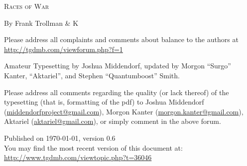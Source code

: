 \pagestyle{plain}

\begin{center} \Huge

\textsc{Races of War}\end{center}



\vspace{2cm}
\begin{center}\large By Frank Trollman \& K\end{center}


\newpage

\vspace*{4in}

\noindent Please address all complaints and comments about balance to the authors at\\
{\color{blue} \href{http://tgdmb.com/viewforum.php?f=1}{http://tgdmb.com/viewforum.php?f=1}}

\vspace{0.2in}



\noindent Amateur Typesetting by Joshua Middendorf, updated by Morgon ``Surgo'' Kanter, ``Aktariel'', and Stephen ``Quantumboost'' Smith.

\vspace{0.15in}

\noindent Please address all comments regarding the quality (or lack thereof) of the typesetting (that is, formatting of the pdf) to Joshua Middendorf (\href{mailto:middendorfproject@gmail.com}{middendorfproject@gmail.com}), Morgon Kanter (\href{mailto:morgon.kanter@gmail.com}{morgon.kanter@gmail.com}), Aktariel (\href{mailto:aktariel@gmail.com}{aktariel@gmail.com}), or simply comment in the above forum.





\vspace{1in}
\noindent Published on \today, version 0.6\\
\noindent You may find the most recent version of this document at:\\
{\color{blue} \href{http://www.tgdmb.com/viewtopic.php?t=36046}{http://www.tgdmb.com/viewtopic.php?t=36046}}

\newpage
